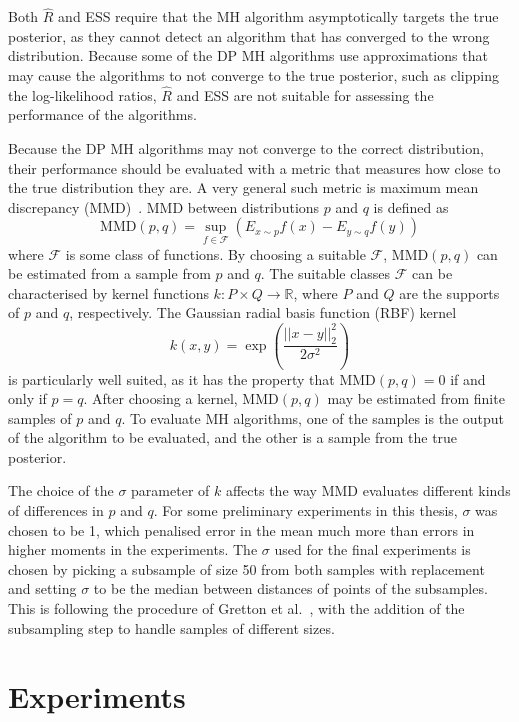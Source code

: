 \documentclass[english,twoside,openright]{HYgraduMLDS}
\newcommand{\R}{\mathbb{R}}
\begin{document}
Both \(\hat{R}\) and ESS require that the MH algorithm asymptotically targets
the true posterior, as they cannot detect an algorithm that has converged to the 
wrong distribution. Because some of the DP MH algorithms use approximations
that may cause the algorithms to not converge to the true posterior, 
such as clipping the log-likelihood ratios, \(\hat{R}\) and ESS are not suitable
for assessing the performance of the algorithms.

Because the DP MH algorithms may not converge to the correct distribution,
their performance should be evaluated with a metric that measures how close 
to the true distribution they are. A very general such metric is maximum mean
discrepancy (MMD)~\cite{GrettonBRSS12}. MMD between distributions \(p\) and \(q\) 
is defined as 
\[
    \mathrm{MMD}(p, q) = \sup_{f\in \mathcal{F}}(E_{x\sim p}f(x) - E_{y\sim q}f(y))
\]
where \(\mathcal{F}\) is some class of functions. By 
choosing a suitable \(\mathcal{F}\), \(\mathrm{MMD}(p, q)\) can be estimated from a 
sample from \(p\) and \(q\). The suitable classes \(\mathcal{F}\) can be 
characterised by kernel functions \(k\colon P\times Q \to \R\), where
\(P\) and \(Q\) are the supports of \(p\) and \(q\), respectively.
The Gaussian radial basis function (RBF) kernel 
\[
    k(x, y) = \exp\left(\frac{||x - y||_2^2}{2\sigma^2}\right)
\]
is particularly well suited, as it has the property that 
\(\mathrm{MMD}(p, q) = 0\) if and only if \(p = q\). After choosing a kernel,
\(\mathrm{MMD}(p, q)\) may be estimated from finite samples of \(p\) and \(q\).
To evaluate MH algorithms, one of the samples is the output of the algorithm
to be evaluated, and the other is a sample from the true posterior.

The choice of the \(\sigma\) parameter of \(k\) affects the way MMD evaluates 
different kinds of differences in \(p\) and \(q\). For some preliminary experiments
in this thesis, \(\sigma\) was chosen to be 1, which penalised error in the 
mean much more than errors in higher moments in the experiments. 
The \(\sigma\) used for the final experiments is chosen by picking a subsample
of size 50
from both samples with replacement and setting \(\sigma\) to be the median 
between distances of points of the subsamples. This is following the procedure of 
Gretton et al.~\cite{GrettonBRSS12}, with the addition of the subsampling step
to handle samples of different sizes.

\chapter{Experiments}\label{experiment_chapter}
\end{document}

